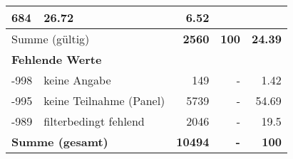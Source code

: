 \begin{longtable}{lXrrr}
       \num{684} &
       \num[round-mode=places,round-precision=2]{26,72} &
         \num[round-mode=places,round-precision=2]{6,52} \\
     \midrule
     \multicolumn{2}{l}{Summe (gültig)} &
       \textbf{\num{2560}} &
     \textbf{100} &
       \textbf{\num[round-mode=places,round-precision=2]{24,39}} \\
     \multicolumn{5}{l}{\textbf{Fehlende Werte}}\\
       -998 &
       keine Angabe &
         \num{149} &
        - &
         \num[round-mode=places,round-precision=2]{1,42} \\
       -995 &
       keine Teilnahme (Panel) &
         \num{5739} &
        - &
         \num[round-mode=places,round-precision=2]{54,69} \\
       -989 &
       filterbedingt fehlend &
         \num{2046} &
        - &
         \num[round-mode=places,round-precision=2]{19,5} \\
     \midrule
     \multicolumn{2}{l}{\textbf{Summe (gesamt)}} &
          \textbf{\num{10494}} &
        \textbf{-} &
        \textbf{100} \\
     \bottomrule
     \end{longtable}
     
